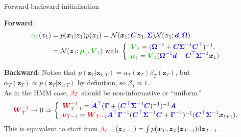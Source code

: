 \documentclass{beamer}
\newcommand{\MN}{{\mathcal N}}
\newcommand{\bs}[1]{\boldsymbol{#1}}
\newcommand{\paint}[2]{{\color{#1}#2}}
\begin{document}
\begin{frame}{Forward-backward initialisation}
 
 \textbf{Forward}:
 \begin{align*}
  \paint{mygreen}{\alpha_1}(\bs{z}_1) &= p(\bs{x}_1|\bs{z}_1)p(\bs{z}_1) = \MN(\bs{x}_1;\paint{myblue}{\bs{C}}\bs{z}_1,\paint{myblue}{\bs{\Sigma}})\MN(\bs{z}_1;\paint{myblue}{\bs{d}},\paint{myblue}{\bs{\Omega}})\\
  &={\cal N}(\bs{z}_1;\paint{mygreen}{\boldsymbol{\mu}_1},\paint{mygreen}{\bs{V}_1}) \text{ with } \left\{\begin{array}{l} \paint{mygreen}{\bs{V}_1} = (\paint{myblue}{\bs{\Omega}^{-1}} + \paint{myblue}{\bs{C}}\paint{myblue}{\bs{\Sigma}^{-1}}\paint{myblue}{\bs{C}^\top})^{-1}, \\ \paint{mygreen}{\boldsymbol{\mu}_1} = \paint{mygreen}{\bs{V}_1}(\paint{myblue}{\bs{\Omega}^{-1}}\paint{myblue}{\bs{d}} + \paint{myblue}{\bs{C}^\top}\paint{myblue}{\bs{\Sigma}^{-1}}\bs{x}_1)\end{array}\right.
 \end{align*}\pause\vspace{3mm}
 
 \textbf{Backward}: Notice that $p(\bs{z}_T|\bs{x}_{1:T})=\alpha_T(\bs{z}_T)\beta_T(\bs{z}_T)$, but $\alpha_T(\bs{z}_T)\propto p(\bs{z}_T|\bs{x}_{1:T})$ by definition, so $\beta_T\propto 1$.\vspace{3mm}\\

 As in the HMM case, $\paint{myred}{\beta_T}$ should be non-informative or ``uniform.''
 \small\begin{equation*}
  \paint{myred}{\bs{W}_T^{-1}}\rightarrow 0 \Rightarrow \left\{\begin{array}{l}
  \paint{myred}{\bs{W}_{T-1}^{-1}} = \paint{myblue}{\bs{A}^\top}(\paint{myblue}{\bs{\Gamma}} + (\paint{myblue}{\bs{C}^\top}\paint{myblue}{\bs{\Sigma}^{-1}}\paint{myblue}{\bs{C}})^{-1})^{-1}\paint{myblue}{\bs{A}} \\
  \paint{myred}{\boldsymbol{\nu}_{T-1}} = \paint{myred}{\bs{W}_{T-1}} \paint{myblue}{\bs{A}^\top}\paint{myblue}{\bs{\Gamma}^{-1}}(\paint{myblue}{\bs{C}^\top}\paint{myblue}{\bs{\Sigma}^{-1}}\paint{myblue}{\bs{C}} + \paint{myblue}{\bs{\Gamma}^{-1}})^{-1} (\paint{myblue}{\bs{C}^\top}\paint{myblue}{\bs{\Sigma}^{-1}}\bs{x}_{t+1}).
  \end{array}\right.
 \end{equation*}
 This is equivalent to start from $\paint{myred}{\beta_{T-1}}(\bs{z}_{T-1}) = \int p(\bs{x}_T,\bs{z}_T|\bs{z}_{T-1})\textrm{d}\bs{z}_{T-1}$.
\end{frame}
\end{document}
